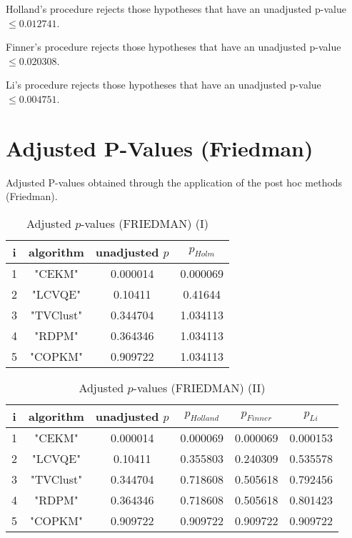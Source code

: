 \documentclass[a4paper,10pt]{article}
\begin{document}
Holland's procedure rejects those hypotheses that have an unadjusted p-value $\le0.012741$.

Finner's procedure rejects those hypotheses that have an unadjusted p-value $\le0.020308$.

Li's procedure rejects those hypotheses that have an unadjusted p-value $\le0.004751$.


\newpage

\section{Adjusted P-Values (Friedman)}


Adjusted P-values obtained through the application of the post hoc methods (Friedman).

\begin{table}[!htp]
\centering\small
\begin{tabular}{cccc}
i&algorithm&unadjusted $p$&$p_{Holm}$\\
\hline1&"CEKM"&0.000014&0.000069\\2&"LCVQE"&0.10411&0.41644\\3&"TVClust"&0.344704&1.034113\\4&"RDPM"&0.364346&1.034113\\5&"COPKM"&0.909722&1.034113\\\hline
\end{tabular}
\caption{Adjusted $p$-values (FRIEDMAN) (I)}
\end{table}
\begin{table}[!htp]
\centering\small
\begin{tabular}{cccccc}
i&algorithm&unadjusted $p$&$p_{Holland}$&$p_{Finner}$&$p_{Li}$\\
\hline1&"CEKM"&0.000014&0.000069&0.000069&0.000153\\2&"LCVQE"&0.10411&0.355803&0.240309&0.535578\\3&"TVClust"&0.344704&0.718608&0.505618&0.792456\\4&"RDPM"&0.364346&0.718608&0.505618&0.801423\\5&"COPKM"&0.909722&0.909722&0.909722&0.909722\\\hline
\end{tabular}
\caption{Adjusted $p$-values (FRIEDMAN) (II)}
\end{table}

\newpage
\end{document}
